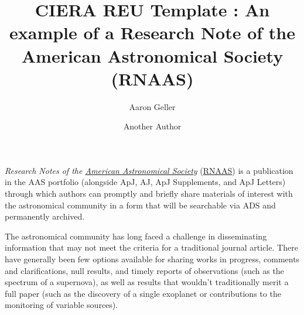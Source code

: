 \documentclass[RNAAS]{aastex62}
\begin{document}
\title{CIERA REU Template : An example of a Research Note of the American Astronomical Society (RNAAS)}


\author{Aaron Geller}

\author{Another Author}

\section{} 

\textit{Research Notes of the \href{https://aas.org}{American Astronomical Society}}
(\href{http://rnaas.aas.org}{RNAAS}) is a publication in the AAS portfolio
(alongside ApJ, AJ, ApJ Supplements, and ApJ Letters) through which authors can 
promptly and briefly share materials of interest with the astronomical community
in a form that will be searchable via ADS and permanently archived.

The astronomical community has long faced a challenge in disseminating
information that may not meet the criteria for a traditional journal article.
There have generally been few options available for sharing works in progress,
comments and clarifications, null results, and timely reports of observations
(such as the spectrum of a supernova), as well as results that wouldn’t
traditionally merit a full paper (such as the discovery of a single exoplanet
or contributions to the monitoring of variable sources). 
\end{document}
